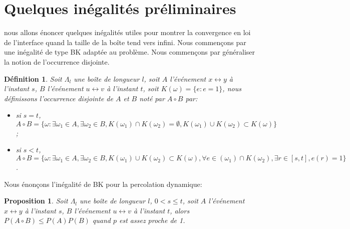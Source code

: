 \documentclass[titlepage,a4paper,12pt]{article}
\newcounter{def}
\newcounter{prop}
\newtheorem{occ}[def]{Définition}
\newtheorem{bk}[prop]{Proposition}
\begin{document}
\section{Quelques inégalités préliminaires}
nous allons énoncer quelques inégalités utiles pour montrer la convergence en loi de l'interface quand la taille de la boîte tend vers infini. Nous commençons par une inégalité de type BK adaptée au problème. Nous commençons par généraliser la notion de l'occurrence disjointe.

\begin{occ}
Soit $\Lambda_l$ une boîte de longueur $l$, soit $A$ l'événement $x\longleftrightarrow y$ à l'instant $s$, $B$ l'événement $u\longleftrightarrow v$ à l'instant $t$, soit $K(\omega) = \{e: e=1\}$, nous définissons l'occurrence disjointe de $A$ et $B$ noté par $A\circ B$ par:
\begin{itemize}
\item si $s=t$, $A\circ B = \{\omega: \exists\omega_1\in A,\exists\omega_2\in B, K(\omega_1)\cap K(\omega_2) = \emptyset, K(\omega_1)\cup K(\omega_2)\subset K(\omega) \}$;
\item si $s<t$, $A\circ B = \{\omega: \exists\omega_1\in A,\exists\omega_2\in B, K(\omega_1)\cup K(\omega_2)\subset K(\omega), \forall e\in (\omega_1)\cap K(\omega_2), \exists r\in [s,t], e(r) = 1 \}$.
\end{itemize}
\end{occ}
Nous énonçons l'inégalité de BK pour la percolation dynamique:

\begin{bk}
Soit $\Lambda_l$ une boîte de longueur $l$, $0<s\leqslant t$, soit $A$ l'événement $x\longleftrightarrow y$ à l'instant $s$, $B$ l'événement $u\longleftrightarrow v$ à l'instant $t$, alors $P(A\circ B) \leqslant P(A)P(B)$ quand $p$ est assez proche de 1.
\end{bk}
\end{document}
